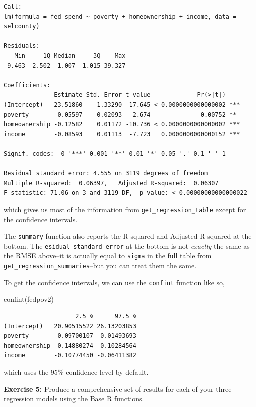 \documentclass[
]{book}
\makeatletter
\newenvironment{Shaded}{\begin{snugshade}}{\end{snugshade}}
\newcommand{\FunctionTok}[1]{\textcolor[rgb]{0,0,0}{#1}}
\newcommand{\NormalTok}[1]{#1}
\newenvironment{kframe}{%
\medskip{}
\setlength{\fboxsep}{.8em}
 \def\at@end@of@kframe{}%
 \ifinner\ifhmode%
  \def\at@end@of@kframe{\end{minipage}}%
  \begin{minipage}{\columnwidth}%
 \fi\fi%
 \def\FrameCommand##1{\hskip\@totalleftmargin \hskip-\fboxsep
 \colorbox{shadecolor}{##1}\hskip-\fboxsep
     \hskip-\linewidth \hskip-\@totalleftmargin \hskip\columnwidth}%
 \MakeFramed {\advance\hsize-\width
   \@totalleftmargin\z@ \linewidth\hsize
   \@setminipage}}%
 {\par\unskip\endMakeFramed%
 \at@end@of@kframe}
\renewenvironment{Shaded}{\begin{kframe}}{\end{kframe}}
\newenvironment{rmdblock}[1]
  {\begin{shaded*}
  }
  {\end{shaded*}
  }
\newenvironment{learncheck}
  {\begin{rmdblock}{warning}}
  {\end{rmdblock}}
\makeatother
\begin{document}
\begin{verbatim}
Call:
lm(formula = fed_spend ~ poverty + homeownership + income, data = selcounty)

Residuals:
   Min     1Q Median     3Q    Max 
-9.463 -2.502 -1.007  1.015 39.327 

Coefficients:
              Estimate Std. Error t value             Pr(>|t|)    
(Intercept)   23.51860    1.33290  17.645 < 0.0000000000000002 ***
poverty       -0.05597    0.02093  -2.674              0.00752 ** 
homeownership -0.12582    0.01172 -10.736 < 0.0000000000000002 ***
income        -0.08593    0.01113  -7.723   0.0000000000000152 ***
---
Signif. codes:  0 '***' 0.001 '**' 0.01 '*' 0.05 '.' 0.1 ' ' 1

Residual standard error: 4.555 on 3119 degrees of freedom
Multiple R-squared:  0.06397,	Adjusted R-squared:  0.06307 
F-statistic: 71.06 on 3 and 3119 DF,  p-value: < 0.00000000000000022
\end{verbatim}

which gives us most of the information from \texttt{get\_regression\_table} except for the confidence intervals.

The \texttt{summary} function also reports the R-squared and Adjusted R-squared at the bottom. The \texttt{esidual\ standard\ error} at the bottom is not \emph{exactly} the same as the RMSE above--it is actually equal to \texttt{sigma} in the full table from \texttt{get\_regression\_summaries}--but you can treat them the same.

To get the confidence intervals, we can use the \texttt{confint} function like so,

\begin{Shaded}
\begin{Highlighting}[]
\FunctionTok{confint}\NormalTok{(fedpov2)}
\end{Highlighting}
\end{Shaded}

\begin{verbatim}
                    2.5 %      97.5 %
(Intercept)   20.90515522 26.13203853
poverty       -0.09700107 -0.01493693
homeownership -0.14880274 -0.10284564
income        -0.10774450 -0.06411382
\end{verbatim}

which uses the 95\% confidence level by default.

\begin{learncheck}
\textbf{Exercise 5:} Produce a comprehensive set of results for each of
your three regression models using the Base R functions.
\end{learncheck}
\end{document}
